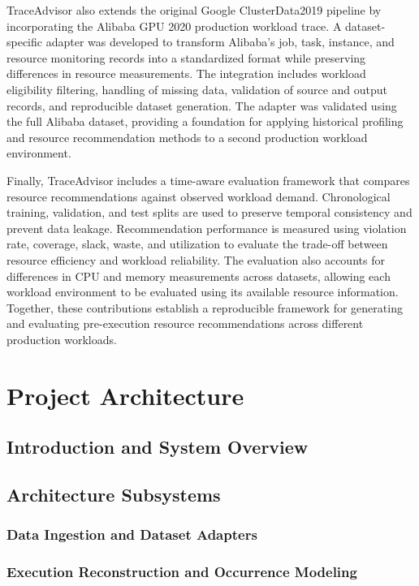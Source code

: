\documentclass{IEEEtran}
\begin{document}
TraceAdvisor also extends the original Google ClusterData2019 pipeline by incorporating the Alibaba GPU 2020 production workload trace. A dataset-specific adapter was developed to transform Alibaba's job, task, instance, and resource monitoring records into a standardized format while preserving differences in resource measurements. The integration includes workload eligibility filtering, handling of missing data, validation of source and output records, and reproducible dataset generation. The adapter was validated using the full Alibaba dataset, providing a foundation for applying historical profiling and resource recommendation methods to a second production workload environment.

Finally, TraceAdvisor includes a time-aware evaluation framework that compares resource recommendations against observed workload demand. Chronological training, validation, and test splits are used to preserve temporal consistency and prevent data leakage. Recommendation performance is measured using violation rate, coverage, slack, waste, and utilization to evaluate the trade-off between resource efficiency and workload reliability. The evaluation also accounts for differences in CPU and memory measurements across datasets, allowing each workload environment to be evaluated using its available resource information. Together, these contributions establish a reproducible framework for generating and evaluating pre-execution resource recommendations across different production workloads.

\clearpage
\section{Project Architecture}
\subsection{Introduction and System Overview}
\subsection{Architecture Subsystems}
\subsubsection{Data Ingestion and Dataset Adapters}
\subsubsection{Execution Reconstruction and Occurrence Modeling}
\end{document}

